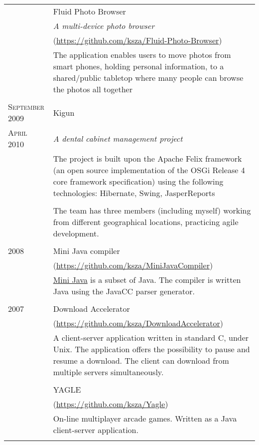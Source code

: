 \documentclass[a4paper,10pt]{article}
\begin{document}
\begin{longtable}{p{2.5cm}|p{11cm}}
 & Fluid Photo Browser\\
 & \emph{A multi-device photo browser}\\
 &
 \footnotesize{(\url{https://github.com/ksza/Fluid-Photo-Browser})}\\ 
 & \footnotesize{The application enables users to move photos from
 smart phones, holding personal information, to a shared/public tabletop where
 many people can browse the photos all together}\\ 
 \multicolumn{2}{c}{} \\
 
 \raggedleft \textsc{September 2009} & Kigun \\
 \raggedleft \textsc{April 2010} & \emph{A dental cabinet management project}
 \\ & \footnotesize{The project is built upon the Apache Felix framework (an open source implementation of the OSGi Release 4 core framework specification)
 using the following technologies: Hibernate, Swing, JasperReports} \\ \\
 & \footnotesize{The team has three members (including myself) working from
 different geographical locations, practicing agile development.} \\
 \multicolumn{2}{c}{} \\ 
  
 \raggedleft \textsc{2008} & Mini Java compiler \\ 
 &
 \footnotesize{(\url{https://github.com/ksza/MiniJavaCompiler})}\\
 & \footnotesize{\href{http://compilers.cs.ucla.edu/vids/MCIIJ2E}{Mini Java} is
a subset of Java. The compiler is written Java using the JavaCC parser generator.} \\
 \multicolumn{2}{c}{} \\
  
 \raggedleft \textsc{2007} & Download Accelerator \\
 &
 \footnotesize{(\url{https://github.com/ksza/DownloadAccelerator})}\\
 & \footnotesize{A client-server application written in standard C, under
 Unix. The application offers the possibility to pause and resume a download. The client can download
 from multiple servers simultaneously.}\\ 
 \multicolumn{2}{c}{} \\
 
 & YAGLE\\
 &\footnotesize{(\url{https://github.com/ksza/Yagle})}\\
 & \footnotesize{On-line multiplayer arcade games. Written as a Java
client-server application.}\\ \multicolumn{2}{c}{} \\
 

\end{longtable}
\end{document}
